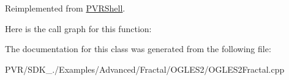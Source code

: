 Reimplemented from \hyperlink{class_p_v_r_shell_ae0eb5f797cbe993a22b8659f9c332578}{P\+V\+R\+Shell}.



Here is the call graph for this function\+:




The documentation for this class was generated from the following file\+:\begin{DoxyCompactItemize}
\item 
P\+V\+R/\+S\+D\+K\+\_./\+Examples/\+Advanced/\+Fractal/\+O\+G\+L\+E\+S2/O\+G\+L\+E\+S2\+Fractal.\+cpp\end{DoxyCompactItemize}
